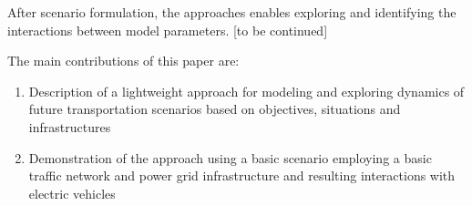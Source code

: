 After scenario formulation, the approaches enables exploring and identifying the interactions between model parameters. [to be continued]

The main contributions of this paper are:

\begin{enumerate}
	\item Description of a lightweight approach for modeling and exploring dynamics of future
	transportation scenarios based on objectives, situations and infrastructures
	\item Demonstration of the approach using a basic scenario employing a basic traffic network and power grid infrastructure
	and resulting interactions with electric vehicles
\end{enumerate}